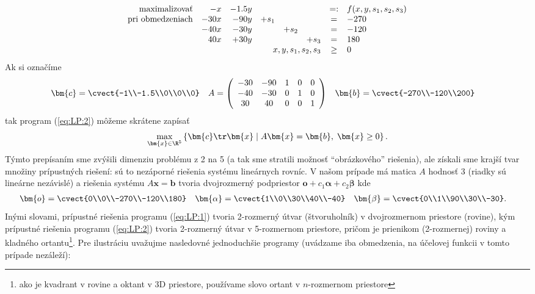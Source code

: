 \begin{equation}
\label{eq:LP:2}
\begin{array}{rrrrrrcl}
  \text{maximalizovať}     & -x   & -  1.5y &         &         &       & =: & f(x,y,s_1,s_2,s_3) \\
   {\rm pri\ obmedzeniach}& -30x & -  90y  & +   s_1 &         &       & =  & -270\\
                          & -40x & -  30y  &         & +   s_2 &       & =  & -120\\
                          &  40x & +  30y  &         &         &+  s_3 & =  & 180\\      
                          &      &         &     \multicolumn{3}{r}{x,y,s_1,s_2,s_3}  &\ge& 0
\end{array}
\end{equation}
%
Ak si označíme
\begin{align*}
 \bm{c}&=\cvect{-1\\-1.5\\0\\0\\0}
&A&=\left(\begin{array}{ccccc}-30&-90&1&0&0\\-40&-30&0&1&0\\30&40&0&0&1\end{array}\right)
&\bm{b}&=\cvect{-270\\-120\\200}
\end{align*}
tak program (\ref{eq:LP:2}) môžeme skrátene zapísať
$$\max_{\bm{x}\in\R^5}\left\{ \bm{c}\tr\bm{x} \mid A\bm{x}=\bm{b},\; \bm{x}\ge0
\right\}.$$ Týmto prepísaním sme zvýšili dimenziu problému z 2 na 5 (a tak sme
stratili možnosť ``obrázkového'' riešenia), ale získali sme krajší tvar množiny
prípustných riešení: sú to nezáporné riešenia systému lineárnych rovníc.  V
našom prípade má matica $A$ hodnosť 3 (riadky sú lineárne nezávislé) a riešenia
systému $A\bm{x}=\bm{b}$ tvoria dvojrozmerný podpriestor
$\bm{o}+c_1\bm{\alpha}+c_2\bm{\beta}$ kde
\begin{align*}
\bm{o}&=\cvect{0\\0\\-270\\-120\\180}
      &\bm{\alpha}&=\cvect{1\\0\\30\\40\\-40}
      &\bm{\beta}&=\cvect{0\\1\\90\\30\\-30}.
\end{align*}
Inými slovami, prípustné riešenia programu (\ref{eq:LP:1}) tvoria 2-rozmerný
útvar (štvoruholník) v dvojrozmernom priestore (rovine), kým prípustné riešenia
programu (\ref{eq:LP:2}) tvoria 2-rozmerný útvar \dom v 5-rozmernom priestore,
pričom \dom je prienikom (2-rozmernej) roviny a kladného ortantu\footnote{ako
  je kvadrant v rovine a oktant v 3D priestore, používame slovo ortant v
$n$-rozmernom priestore}. Pre ilustráciu uvažujme nasledovné jednoduchšie
programy (uvádzame iba obmedzenia, na účelovej funkcii v tomto prípade
nezáleží):


